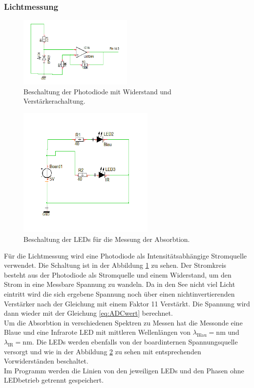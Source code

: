 \documentclass[12pt,a4paper,titlepage,headinclude,bibtotoc]{scrartcl}
\begin{document}
\subsubsection{Lichtmessung}
\begin{figure}[!h]
\centering
\includegraphics[width=0.5\textwidth]{Fotos/PhotodiodeSchaltung.png}
\caption{Beschaltung der Photodiode mit Widerstand und Verstärkerachaltung.}
\label{fig:PhotodiodeSchaltung}
\end{figure}
\begin{figure}[!h]
\centering
\includegraphics[width=0.6\textwidth]{Fotos/LEDSchaltung.png}
\caption{Beschaltung der LEDs für die Messung der Absorbtion.}
\label{fig:LEDSchaltung}
\end{figure}
Für die Lichtmessung wird eine Photodiode als Intensitätsabhängige Stromquelle verwendet.
Die Schaltung ist in der Abbildung \ref{fig:PhotodiodeSchaltung} zu sehen.
Der Stromkreis besteht aus der Photodiode als Stromquelle und einem Widerstand, um den Strom in eine Messbare Spannung zu wandeln.
Da in den See nicht viel Licht eintritt wird die sich ergebene Spannung noch über einen nichtinvertierenden Verstärker nach der Gleichung %
mit einem Faktor 11 Verstärkt.
Die Spannung wird dann wieder mit der Gleichung \eqref{eq:ADCwert} berechnet.\\
Um die Absorbtion in verschiedenen Spektren zu Messen hat die Messonde eine Blaue und eine Infrarote LED %
mit mittleren Wellenlängen von $\lambda_\text{Blau}=\si{\nano\meter}$ und $\lambda_\text{IR}=\si{\nano\meter}$. %
Die LEDs werden ebenfalls von der boardinternen Spannungsquelle versorgt und wie in der Abbildung \ref{fig:LEDSchaltung} zu sehen mit entsprechenden Vorwiderständen beschaltet.\\
Im Programm werden die Linien von den jeweiligen LEDs und den Phasen ohne LEDbetrieb getrennt gespeichert.
\end{document}
